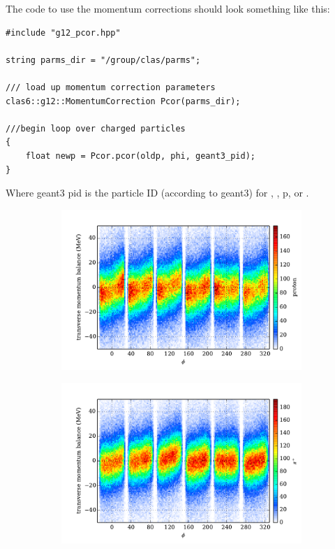 The code to use the momentum corrections should look something like this:
\begin{verbatim}
#include "g12_pcor.hpp"

string parms_dir = "/group/clas/parms";

/// load up momentum correction parameters
clas6::g12::MomentumCorrection Pcor(parms_dir);

///begin loop over charged particles
{
    float newp = Pcor.pcor(oldp, phi, geant3_pid);
}
\end{verbatim}

Where geant3 pid is the particle ID (according to geant3) for \π[+], \π[-], p, \K[+] or \K[-].

\begin{figure}\begin{center}
\begin{subfigure}{0.4\columnwidth}
    \includegraphics[width=\columnwidth]{figures/pcor/pcor_mptbal_p.pdf}
\end{subfigure}
\begin{subfigure}{0.4\columnwidth}
    \includegraphics[width=\columnwidth]{figures/pcor/pcor_mptbal_pip.pdf}

\end{subfigure}
\end{center}
\end{figure}
